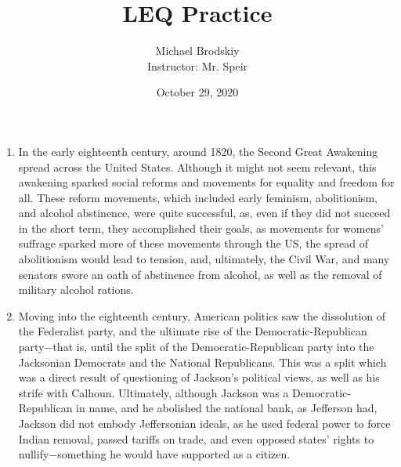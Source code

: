 \documentclass[12pt]{article}
\title{LEQ Practice}
\date{October 29, 2020}
\author{Michael Brodskiy\\ \small Instructor: Mr. Speir}
\begin{document}
\begin{enumerate}

    \maketitle

  \item In the early eighteenth century, around 1820, the Second Great Awakening spread across the United States. Although it might not seem relevant, this awakening sparked social reforms and movements for equality and freedom for all. These reform movements, which included early feminism, abolitionism, and alcohol abstinence, were quite successful, as, even if they did not succeed in the short term, they accomplished their goals, as movements for womens' suffrage sparked more of these movements through the US, the spread of abolitionism would lead to tension, and, ultimately, the Civil War, and many senators swore an oath of abstinence from alcohol, as well as the removal of military alcohol rations. 

  \item Moving into the eighteenth century, American politics saw the dissolution of the Federalist party, and the ultimate rise of the Democratic-Republican party$-$that is, until the split of the Democratic-Republican party into the Jacksonian Democrats and the National Republicans. This was a split which was a direct result of questioning of Jackson's political views, as well as his strife with Calhoun. Ultimately, although Jackson was a Democratic-Republican in name, and he abolished the national bank, as Jefferson had, Jackson did not embody Jeffersonian ideals, as he used federal power to force Indian removal, passed tariffs on trade, and even opposed states' rights to nullify$-$something he would have supported as a citizen.

\end{enumerate}
\end{document}
